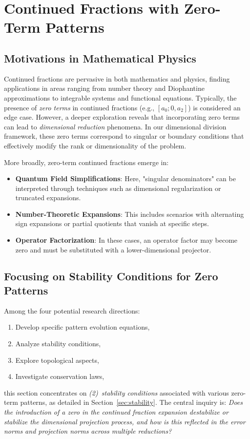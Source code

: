 

\section{Continued Fractions with Zero-Term Patterns}
\label{sec:zero-continued-fractions}

\subsection{Motivations in Mathematical Physics}
Continued fractions are pervasive in both mathematics and physics, finding applications in areas ranging from number theory and Diophantine approximations to integrable systems and functional equations. Typically, the presence of \emph{zero terms} in continued fractions (e.g., \([a_0; 0, a_2]\)) is considered an edge case. However, a deeper exploration reveals that incorporating zero terms can lead to \emph{dimensional reduction} phenomena. In our dimensional division framework, these zero terms correspond to singular or boundary conditions that effectively modify the rank or dimensionality of the problem.

More broadly, zero-term continued fractions emerge in:
\begin{itemize}
  \item \textbf{Quantum Field Simplifications}: Here, "singular denominators" can be interpreted through techniques such as dimensional regularization or truncated expansions.
  \item \textbf{Number-Theoretic Expansions}: This includes scenarios with alternating sign expansions or partial quotients that vanish at specific steps.
  \item \textbf{Operator Factorization}: In these cases, an operator factor may become zero and must be substituted with a lower-dimensional projector.
\end{itemize}

\subsection{Focusing on Stability Conditions for Zero Patterns}
Among the four potential research directions:
\begin{enumerate}
  \item Develop specific pattern evolution equations,
  \item Analyze stability conditions,
  \item Explore topological aspects,
  \item Investigate conservation laws,
\end{enumerate}
this section concentrates on \emph{(2)~stability conditions} associated with various zero-term patterns, as detailed in Section~\ref{sec:stability}. The central inquiry is: \emph{Does the introduction of a zero in the continued fraction expansion destabilize or stabilize the dimensional projection process, and how is this reflected in the error norms and projection norms across multiple reductions?}

